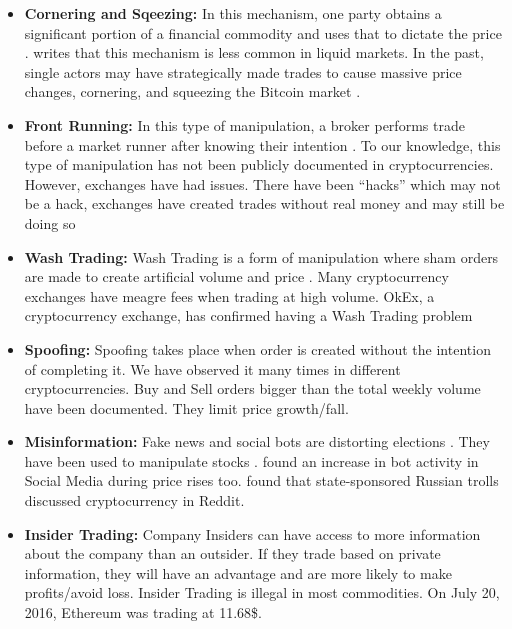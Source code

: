 \documentclass[letterpaper]{article}
\begin{document}
\begin{itemize}
    \item \textbf{Cornering and Sqeezing:} In this mechanism, one party obtains a significant portion of a financial 
    commodity and uses that to dictate the price \cite{markham2015law,lin2016new}. \cite{lin2016new} writes that 
    this mechanism is less common in liquid markets. In the past, single actors may have strategically made trades to cause 
    massive price changes, cornering, and squeezing the Bitcoin market \cite{griffin2019bitcoin}. 
    \item \textbf{Front Running:} In this type of manipulation, a broker performs trade before a market runner after 
    knowing their intention \cite{hazen1985law,markham2015law,lin2016new}. To our knowledge, this type of manipulation has not been 
    publicly documented in cryptocurrencies. However, exchanges have had issues. There have been “hacks” which 
    may not be a hack, exchanges have created trades without real money \cite{gandal2018price} and may still be 
    doing so \cite{griffin2019bitcoin}
    \item \textbf{Wash Trading:} Wash Trading is a form of manipulation where sham orders are made to create artificial volume and
    price \cite{teall2018financial}. Many cryptocurrency exchanges have meagre fees when trading at high volume. 
    OkEx, a cryptocurrency exchange, has confirmed having a Wash Trading problem \cite{baker_2019}
    \item \textbf{Spoofing:} Spoofing takes place when order is created without the intention of completing it. We have observed it many 
    times in different cryptocurrencies. Buy and Sell orders bigger than the total weekly volume have been documented. 
    They limit price growth/fall. \cite{unsafecoin_2016,bob_2017} 
    \item \textbf{Misinformation:} Fake news and social bots are distorting elections \cite{bessi2016social}. 
    They have been 
    used to manipulate stocks \cite{renault2017market}. 
    \cite{mirtaheri2019identifying} found an increase in bot activity in Social Media during price rises too.  
    \cite{zannettou2019let} found that state-sponsored Russian trolls discussed cryptocurrency in Reddit.
    \item \textbf{Insider Trading:} Company Insiders can have access to more information about the company than an outsider. If 
    they trade based on private information, they will have an advantage and are more likely to make profits/avoid 
    loss. Insider Trading is illegal in most commodities. On July 20, 2016, Ethereum was trading at 11.68\$. 

\end{itemize}
\end{document}

